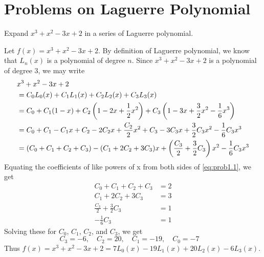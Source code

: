 \documentclass[../main-sheet.tex]{subfiles}
\begin{document}
\section{Problems on Laguerre Polynomial}
\begin{prob}
    Expand \( x^3+x^2-3x+2 \) in a series of Laguerre polynomial.
\end{prob}
\begin{soln}
    Let \( f(x)=x^3+x^2-3x+2 \). By definition of Laguerre polynomial, we know that \( L_n(x) \) is a polynomial of degree \( n \). Since \( x^3+x^2-3x+2 \) is a polynomial of degree \( 3 \), we may write
    \begin{align}
        &x^3+x^2-3x+2\notag\\
        &=C_0L_0(x)+C_1L_1(x)+C_2L_2(x)+C_3L_3(x)\notag\\
        &=C_0+C_1(1-x)+C_2\left( 1-2x+\frac{1}{2}x^2 \right)+C_3\left( 1-3x+\frac{3}{2}x^2-\frac{1}{6}x^3 \right)\notag\\
        &=C_0+C_1-C_1x+C_2-2C_2x+\frac{C_2}{2}x^2+C_3-3C_3x+\frac{3}{2}C_3x^2-\frac{1}{6}C_3x^3\notag\\
        &=(C_0+C_1+C_2+C_3)-(C_1+2C_2+3C_3)x+\left( \frac{C_3}{2}+\frac{3}{2}C_3 \right)x^2-\frac{1}{6}C_3x^3 \label{eq:prob1.1}
    \end{align}
    Equating the coefficients of like powers of x from both sides of \eqref{eq:prob1.1}, we get
    \begin{align*}
        C_0+C_1+C_2+C_3&=2\\
        C_1+2C_2+3C_3&=3\\
        \frac{C_3}{2}+\frac{3}{2}C_3&=1\\
        -\frac{1}{6}C_3&=1
    \end{align*}
    Solving these for \( C_0\), \(C_1\), \(C_2\), and \(C_3 \), we get 
    \[C_3=-6,\quad C_2=20,\quad C_1=-19,\quad C_0=-7\quad\]
    Thus \( f(x)=x^3+x^2-3x+2=7L_0(x)-19L_1(x)+20L_2(x)-6L_3(x) \).
\end{soln}
\end{document}
